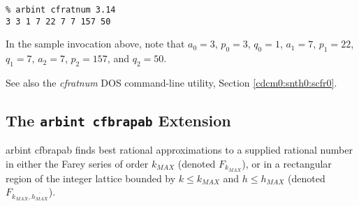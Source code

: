 \begin{tclcommandsampleinvocations}
\begin{scriptsize}
\begin{verbatim}
% arbint cfratnum 3.14
3 3 1 7 22 7 7 157 50
\end{verbatim}
\end{scriptsize}

In the sample invocation above, note that $a_0 = 3$,
$p_0 = 3$, $q_0 = 1$, $a_1 = 7$, $p_1 = 22$, $q_1 = 7$,
$a_2 = 7$, $p_2 = 157$, and $q_2 = 50$.  
\end{tclcommandsampleinvocations}

\begin{tclcommandseealso}
See also the \emph{cfratnum} DOS command-line utility, 
Section \ref{cdcm0:snth0:scfr0}.
\end{tclcommandseealso}

\subsection{The \texttt{arbint cfbrapab} Extension}
\label{cxtn0:snth0:sbra0}

\begin{tclcommandname}{arbint cfbrapab}%
finds best rational approximations to a supplied rational
number in either the Farey series of order $k_{MAX}$ (denoted
$F_{k_{MAX}}$), or in a rectangular region of the integer lattice
bounded by $k \leq k_{MAX}$ and $h \leq h_{MAX}$
(denoted $F_{k_{MAX}, \overline{h_{MAX}}}$).
\end{tclcommandname}

\begin{tclcommandsynopsis}
\end{tclcommandsynopsis}

